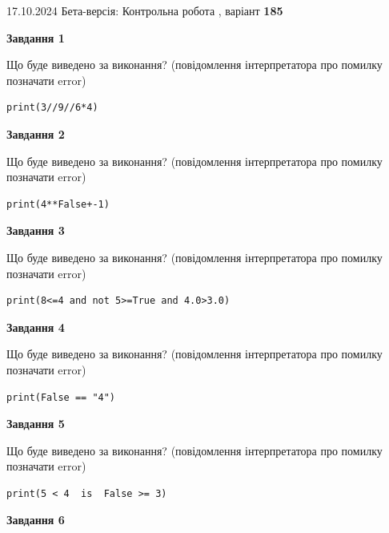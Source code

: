 \documentclass[12pt, ukrainian]{article}
\begin{document}
{\Large{17.10.2024 Бета-версія: Контрольна робота , варіант  \No \textbf { 185 }\par}}
{
\begin {large}
{\begin {center}\textbf{Завдання 1}\end {center}}

Що буде виведено за виконання? (повідомлення інтерпретатора про помилку позначати error)\par
\begin{verbatim}
print(3//9//6*4)
\end{verbatim}

{\begin {center}\textbf{Завдання 2}\end {center}}

Що буде виведено за виконання? (повідомлення інтерпретатора про помилку позначати error)\par
\begin{verbatim}
print(4**False+-1)
\end{verbatim}

{\begin {center}\textbf{Завдання 3}\end {center}}

Що буде виведено за виконання? (повідомлення інтерпретатора про помилку позначати error)\par
\begin{verbatim}
print(8<=4 and not 5>=True and 4.0>3.0)
\end{verbatim}

{\begin {center}\textbf{Завдання 4}\end {center}}

Що буде виведено за виконання? (повідомлення інтерпретатора про помилку позначати error)\par
\begin{verbatim}
print(False == "4")
\end{verbatim}

{\begin {center}\textbf{Завдання 5}\end {center}}

Що буде виведено за виконання? (повідомлення інтерпретатора про помилку позначати error)\par
\begin{verbatim}
print(5 < 4  is  False >= 3)
\end{verbatim}

{\begin {center}\textbf{Завдання 6}\end {center}}


\end{large}}
\end{document}
